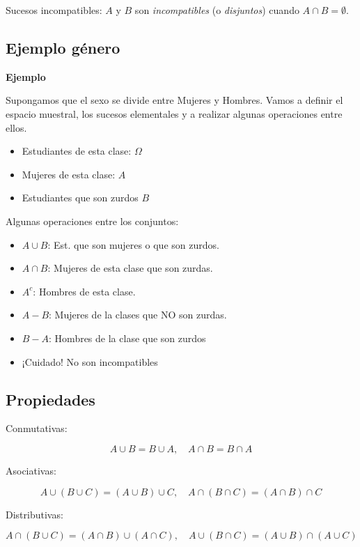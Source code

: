 \documentclass[]{book}
\providecommand{\tightlist}{%
  \setlength{\itemsep}{0pt}\setlength{\parskip}{0pt}}
\begin{document}
 Sucesos incompatibles: \(A\) y \(B\) son \emph{incompatibles} (o \emph{disjuntos}) cuando \(A\cap B=\emptyset\).

\hypertarget{ejemplo-guxe9nero}{%
\subsection{Ejemplo género}\label{ejemplo-guxe9nero}}

\textbf{Ejemplo}

Supongamos que el sexo se divide entre Mujeres y Hombres. Vamos a definir el espacio muestral, los sucesos elementales y a realizar algunas operaciones entre ellos.

\begin{itemize}
\tightlist
\item
  Estudiantes de esta clase: \(\Omega\)
\item
  Mujeres de esta clase: \(A\)
\item
  Estudiantes que son zurdos \(B\)
\end{itemize}

Algunas operaciones entre los conjuntos:

\begin{itemize}
\tightlist
\item
  \(A\cup B\): Est. que son mujeres o que son zurdos.
\item
  \(A\cap B\): Mujeres de esta clase que son zurdas.
\item
  \(A^c\): Hombres de esta clase.
\item
  \(A-B\): Mujeres de la clases que NO son zurdas.
\item
  \(B-A\): Hombres de la clase que son zurdos
\item
  ¡Cuidado! No son incompatibles
\end{itemize}

\hypertarget{propiedades}{%
\subsection{Propiedades}\label{propiedades}}

Conmutativas:

\[A\cup B=B\cup A, \quad A\cap B=B\cap A\]

Asociativas:

\[A\cup(B\cup C)=(A\cup B)\cup C, \quad A\cap(B\cap C)=(A\cap B)\cap C\]

Distributivas:

\[A\cap(B\cup C)=(A\cap B)\cup (A\cap C), \quad A\cup(B\cap C)=(A\cup B)\cap (A\cup C)\]
\end{document}

